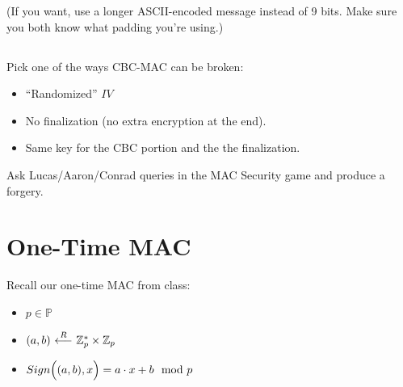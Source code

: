 \documentclass[12pt]{article}
\begin{document}
(If you want, use a longer ASCII-encoded message instead of 9 bits. Make sure you both know what padding you're using.)

\subsection{}

Pick one of the ways CBC-MAC can be broken:
\begin{itemize}
\item ``Randomized'' $IV$
\item No finalization (no extra encryption at the end).
\item Same key for the CBC portion and the the finalization.
\end{itemize}

Ask Lucas/Aaron/Conrad queries in the MAC Security game and produce a forgery.


\newpage
\section{One-Time MAC}

Recall our one-time MAC from class:


\begin{itemize}
\item $p \in \mathbb{P}$
\item $(a, b) {\ \overset{R}\longleftarrow\ } \mathbb{Z}_p^* \times \mathbb{Z}_p$
\item $Sign\Big((a, b), x\Big) = a\cdot x + b \mod p$
\end{itemize}
%
%
%
%
%

\subsection{}
\end{document}
